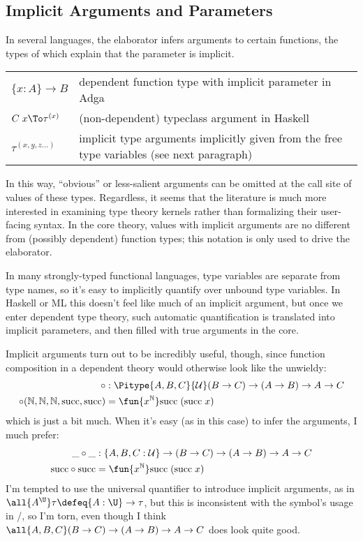 \documentclass[11pt]{article} %
\theoremstyle{definition}
\theoremstyle{remark}
\begin{document}
\subsection{Implicit Arguments and Parameters}

In several languages, the elaborator infers arguments to certain functions, the types of which explain that the parameter is implicit.
\begin{center}
\renewcommand{\arraystretch}{1.2}
\begin{tabular}{lp{8.2cm}}
$\{x : A\} \to B$ & dependent function type with implicit parameter in Adga \\
$C\;x \To \tau^{(x)}$ & (non-dependent) typeclass argument in Haskell \\
$\tau^{(x, y, z \ldots)}$ & implicit type arguments implicitly given from the free type variables (see next paragraph) \\
\end{tabular}
\end{center}
In this way, ``obvious'' or less-salient arguments can be omitted at the call site of values of these types.
Regardless, it seems that the literature is much more interested in examining type theory kernels rather than formalizing their user-facing syntax.
In the core theory, values with implicit arguments are no different from (possibly dependent) function types; this notation is only used to drive the elaborator.

In many strongly-typed functional languages, type variables are separate from type names, so it's easy to implicitly quantify over unbound type variables.
In Haskell or ML this doesn't feel like much of an implicit argument, but once we enter dependent type theory, such automatic quantification is translated into implicit parameters, and then filled with true arguments in the core.

Implicit arguments turn out to be incredibly useful, though, since function composition in a dependent theory would otherwise look like the unwieldy:
\begin{align*}
\circ &: \Pitype{A,B,C}{\mathcal U} (B \to C) \to (A \to B) \to A \to C \\
\circ(\mathbb N, \mathbb N, \mathbb N, \mathrm{succ}, \mathrm{succ}) &= \fun{x^\mathbb N}\mathrm{succ}\;(\mathrm{succ}\;x)
\end{align*}
which is just a bit much.
When it's easy (as in this case) to infer the arguments, I much prefer:
\begin{align*}
\_ \circ \_ &: \{A, B, C : \mathcal U\} \to (B \to C) \to (A \to B) \to A \to C \\
\mathrm{succ} \circ \mathrm{succ} &= \fun{x^\mathbb N}\mathrm{succ}\;(\mathrm{succ}\;x)
\end{align*}
I'm tempted to use the universal quantifier to introduce implicit arguments, as in $\all{A^\U}\tau \defeq \{A : \U\} \to \tau$,
  but this is inconsistent with the symbol's usage in \SystemF/, so I'm torn, even though I think $\all{A,B,C}(B \to C) \to (A \to B) \to A \to C$ does look quite good.
\end{document}
